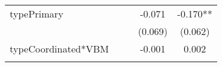\documentclass[12pt,twoside]{reedthesis}
\begin{document}
\begin{longtable}[]{@{}lcccc@{}}
\begin{minipage}[t]{0.26\columnwidth}
  typePrimary\strut
  \end{minipage} & \begin{minipage}[t]{0.12\columnwidth}\centering\strut
  \strut
  \end{minipage} & \begin{minipage}[t]{0.13\columnwidth}\centering\strut
  \strut
  \end{minipage} & \begin{minipage}[t]{0.14\columnwidth}\centering\strut
  -0.071\strut
  \end{minipage} & \begin{minipage}[t]{0.14\columnwidth}\centering\strut
  -0.170**\strut
  \end{minipage}\tabularnewline
  \begin{minipage}[t]{0.26\columnwidth}\raggedright\strut
  \strut
  \end{minipage} & \begin{minipage}[t]{0.12\columnwidth}\centering\strut
  \strut
  \end{minipage} & \begin{minipage}[t]{0.13\columnwidth}\centering\strut
  \strut
  \end{minipage} & \begin{minipage}[t]{0.14\columnwidth}\centering\strut
  (0.069)\strut
  \end{minipage} & \begin{minipage}[t]{0.14\columnwidth}\centering\strut
  (0.062)\strut
  \end{minipage}\tabularnewline
  \begin{minipage}[t]{0.26\columnwidth}\raggedright\strut
  typeCoordinated*VBM\strut
  \end{minipage} & \begin{minipage}[t]{0.12\columnwidth}\centering\strut
  \strut
  \end{minipage} & \begin{minipage}[t]{0.13\columnwidth}\centering\strut
  \strut
  \end{minipage} & \begin{minipage}[t]{0.14\columnwidth}\centering\strut
  -0.001\strut
  \end{minipage} & \begin{minipage}[t]{0.14\columnwidth}\centering\strut
  0.002\strut
  \end{minipage}\tabularnewline
  \begin{minipage}[t]{0.26\columnwidth}\raggedright\strut
  \strut
  \end{minipage} & \begin{minipage}[t]{0.12\columnwidth}\centering\strut

\end{minipage}
\end{longtable}
\end{document}
